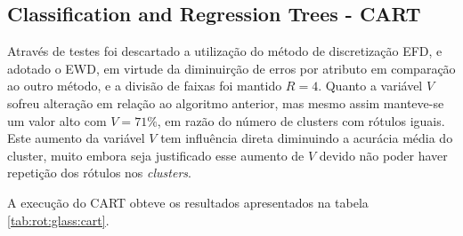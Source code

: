 \subsection{Classification and Regression Trees - CART} \label{cap:resultados:ssec:glass:cart}


Através de testes foi descartado a utilização do método de discretização EFD, e adotado o EWD, em virtude da diminuirção de erros por atributo em comparação ao outro método, e a divisão de faixas foi mantido ${R=4}$. Quanto a variável ${V}$ sofreu alteração em relação ao algoritmo anterior, mas mesmo assim manteve-se um valor alto com ${V=71\%}$, em razão do número de clusters com rótulos iguais. Este aumento da variável ${V}$ tem influência direta diminuindo a acurácia média do cluster, muito embora seja justificado esse aumento de ${V}$ devido não poder haver repetição dos rótulos nos \textit{clusters}.

A execução do CART obteve os resultados apresentados na tabela \ref{tab:rot:glass:cart}.

